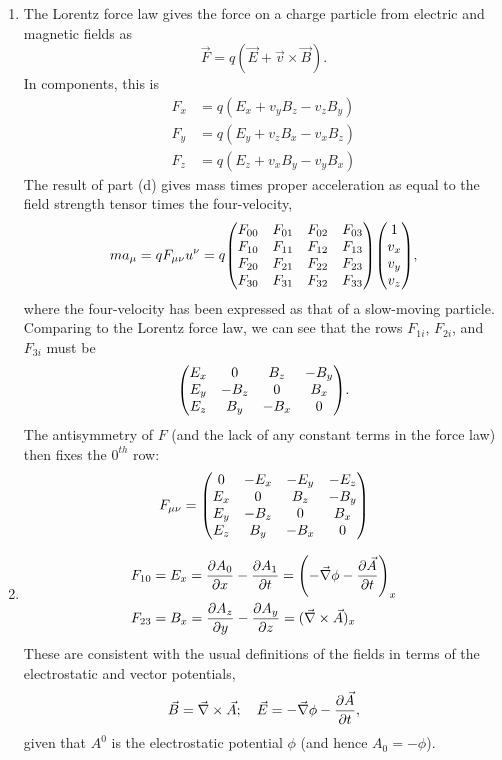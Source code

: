 \documentclass[12pt]{article}
\begin{document}
\begin{enumerate}[label=(\alph*)]
    \item The Lorentz force law gives the force on a charge particle from electric and magnetic fields as
    \[ \vec{F} = q\left(\vec{E} + \vec{v}\times\vec{B}\right). \]
    In components, this is
    \begin{align*}
        F_x &= q\left(E_x + v_yB_z - v_zB_y\right) \\
        F_y &= q\left(E_y + v_zB_x - v_xB_z\right) \\
        F_z &= q\left(E_z + v_xB_y - v_yB_x\right)
    \end{align*}
    The result of part (d) gives mass times proper acceleration as equal to the field strength tensor times the four-velocity,
    \[ ma_\mu = q F_{\mu\nu}u^\nu = q\mqty(F_{00}&F_{01}&F_{02}&F_{03}\\F_{10}&F_{11}&F_{12}&F_{13}\\F_{20}&F_{21}&F_{22}&F_{23}\\F_{30}&F_{31}&F_{32}&F_{33})\mqty(1\\v_x\\v_y\\v_z), \]
    where the four-velocity has been expressed as that of a slow-moving particle. Comparing to the Lorentz force law, we can see that the rows $F_{1i}$, $F_{2i}$, and $F_{3i}$ must be
    \[ \mqty(E_x&0&B_z&-B_y\\E_y&-B_z&0&B_x\\E_z&B_y&-B_x&0). \]
    The antisymmetry of $F$ (and the lack of any constant terms in the force law) then fixes the $0^{th}$ row:
    \[ F_{\mu\nu} = \mqty(0&-E_x&-E_y&-E_z\\E_x&0&B_z&-B_y\\E_y&-B_z&0&B_x\\E_z&B_y&-B_x&0) \]

    \item
    \begin{align*}
        F_{10} &= E_x = \pdv{A_0}{x} - \pdv{A_1}{t} = \left(-\vec{\nabla}\phi - \pdv{\vec{A}}{t}\right)_x \\
        F_{23} &= B_x = \pdv{A_z}{y} - \pdv{A_y}{z} = (\vec{\nabla}\times\vec{A})_x
    \end{align*}
    These are consistent with the usual definitions of the fields in terms of the electrostatic and vector potentials,
    \[ \vec{B} = \vec{\nabla}\times\vec{A}; \quad \vec{E} = -\vec{\nabla}\phi - \pdv{\vec{A}}{t}, \]
    given that $A^0$ is the electrostatic potential $\phi$ (and hence $A_0 = -\phi$).
\end{enumerate}
\end{document}
